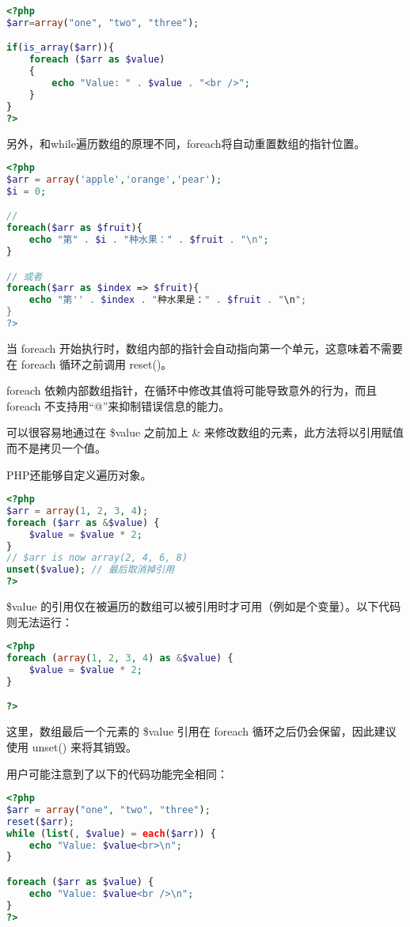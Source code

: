 \begin{lstlisting}[language=PHP]
<?php
$arr=array("one", "two", "three");

if(is_array($arr)){
	foreach ($arr as $value)
	{
		echo "Value: " . $value . "<br />";
	}
}
?>
\end{lstlisting}


另外，和while遍历数组的原理不同，foreach将自动重置数组的指针位置。

\begin{lstlisting}[language=PHP]
<?php
$arr = array('apple','orange','pear');
$i = 0;

// 
foreach($arr as $fruit){
	echo "第" . $i . "种水果：" . $fruit . "\n";
}

// 或者
foreach($arr as $index => $fruit){
	echo "第'' . $index . "种水果是：" . $fruit . "\n";
}
?>
\end{lstlisting}


当 foreach 开始执行时，数组内部的指针会自动指向第一个单元，这意味着不需要在 foreach 循环之前调用 reset()。

foreach 依赖内部数组指针，在循环中修改其值将可能导致意外的行为，而且foreach 不支持用“@”来抑制错误信息的能力。


可以很容易地通过在 \$value 之前加上 \& 来修改数组的元素，此方法将以引用赋值而不是拷贝一个值。


PHP还能够自定义遍历对象。



\begin{lstlisting}[language=PHP]
<?php
$arr = array(1, 2, 3, 4);
foreach ($arr as &$value) {
    $value = $value * 2;
}
// $arr is now array(2, 4, 6, 8)
unset($value); // 最后取消掉引用
?>
\end{lstlisting}

\$value 的引用仅在被遍历的数组可以被引用时才可用（例如是个变量）。以下代码则无法运行：


\begin{lstlisting}[language=PHP]
<?php
foreach (array(1, 2, 3, 4) as &$value) {
    $value = $value * 2;
}

?>
\end{lstlisting}

这里，数组最后一个元素的 \$value 引用在 foreach 循环之后仍会保留，因此建议使用 unset() 来将其销毁。

用户可能注意到了以下的代码功能完全相同：

\begin{lstlisting}[language=PHP]
<?php
$arr = array("one", "two", "three");
reset($arr);
while (list(, $value) = each($arr)) {
    echo "Value: $value<br>\n";
}

foreach ($arr as $value) {
    echo "Value: $value<br />\n";
}
?>
\end{lstlisting}

